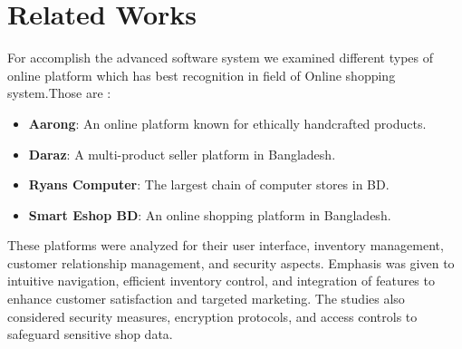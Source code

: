 \section{Related Works}
For accomplish the advanced software system we examined different types of online platform which has best recognition in field of Online shopping system.Those are :
\begin{itemize}
\item \textbf{Aarong}: An online platform known for ethically handcrafted products.
\item \textbf{Daraz}: A multi-product seller platform in Bangladesh.
\item \textbf{Ryans Computer}: The largest chain of computer stores in BD.
\item \textbf{Smart Eshop BD}: An online shopping platform in Bangladesh.
\end{itemize}

These platforms were analyzed for their user interface, inventory management, customer relationship management, and security aspects. Emphasis was given to intuitive navigation, efficient inventory control, and integration of features to enhance customer satisfaction and targeted marketing. The studies also considered security measures, encryption protocols, and access controls to safeguard sensitive shop data.